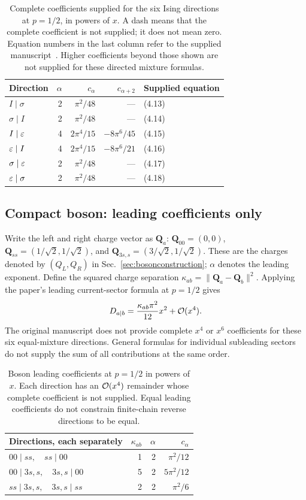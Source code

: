\begin{table}[htbp]\centering
\begin{tabular}{lrrrl}\toprule
Direction & $\alpha$ & $c_\alpha$ & $c_{\alpha+2}$ & Supplied equation\\\midrule
$I\mid\sigma$ &2&$\pi^2/48$&---&(4.13)\\
$\sigma\mid I$ &2&$\pi^2/48$&---&(4.14)\\
$I\mid\varepsilon$ &4&$2\pi^4/15$&$-8\pi^6/45$&(4.15)\\
$\varepsilon\mid I$ &4&$2\pi^4/15$&$-8\pi^6/21$&(4.16)\\
$\sigma\mid\varepsilon$ &2&$\pi^2/48$&---&(4.17)\\
$\varepsilon\mid\sigma$ &2&$\pi^2/48$&---&(4.18)\\\bottomrule
\end{tabular}
\caption{Complete coefficients supplied for the six Ising directions at
$p=1/2$, in powers of $x$. A dash means that the complete coefficient
is not supplied; it does not mean zero. Equation numbers in the last column
refer to the supplied manuscript~\cite{theory}. Higher coefficients beyond those
shown are not supplied for these directed mixture formulas.}
\label{tab:isingcoeff}
\end{table}

\subsection{Compact boson: leading coefficients only}
Write the left and right charge vector as $\boldsymbol Q_a$:
$\boldsymbol Q_{00}=(0,0)$,
$\boldsymbol Q_{ss}=(1/\sqrt2,1/\sqrt2)$, and
$\boldsymbol Q_{3s,s}=(3/\sqrt2,1/\sqrt2)$.
These are the charges denoted by $(Q_L,Q_R)$ in
Sec.~\ref{sec:bosonconstruction}; $\alpha$ denotes the leading exponent.
Define the squared charge separation
$\kappa_{ab}=\|\boldsymbol Q_a-\boldsymbol Q_b\|^2$.
Applying the paper's leading current-sector formula at $p=1/2$ gives
\begin{equation}
 D_{a\mid b}=\frac{\kappa_{ab}\pi^2}{12}x^2+\mathcal O(x^4).
 \label{eq:bosonresult}
\end{equation}
The original manuscript does not provide complete $x^4$ or $x^6$
coefficients for these six equal-mixture directions. General formulas
for individual subleading sectors do not supply the sum of all
contributions at the same order.

\begin{table}[htbp]\centering
\begin{tabular}{lrrr}\toprule
Directions, each separately & $\kappa_{ab}$ & $\alpha$ & $c_\alpha$\\\midrule
$00\mid ss,\quad ss\mid00$ &1&2&$\pi^2/12$\\
$00\mid3s,s,\quad3s,s\mid00$ &5&2&$5\pi^2/12$\\
$ss\mid3s,s,\quad3s,s\mid ss$ &2&2&$\pi^2/6$\\\bottomrule
\end{tabular}
\caption{Boson leading coefficients at $p=1/2$ in powers of $x$.
Each direction has an $\mathcal O(x^4)$ remainder whose complete coefficient
is not supplied. Equal leading coefficients do not constrain
finite-chain reverse directions to be equal.}
\label{tab:bosoncoeff}
\end{table}

